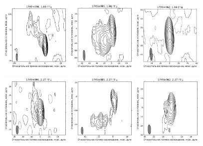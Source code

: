 \addtocounter{figure}{-1}
\begin{figure}
  \centering

  \includegraphics[width=0.3\textwidth]{1749+096_L.pdf}
  \includegraphics[width=0.3\textwidth]{1745+085_L.pdf}
  \includegraphics[width=0.3\textwidth]{1749+062_L.pdf}


  \includegraphics[width=0.3\textwidth]{1749+096_S.pdf}
  \includegraphics[width=0.3\textwidth]{1745+085_S.pdf}
  \includegraphics[width=0.3\textwidth]{1749+062_S.pdf}



\end{figure}

